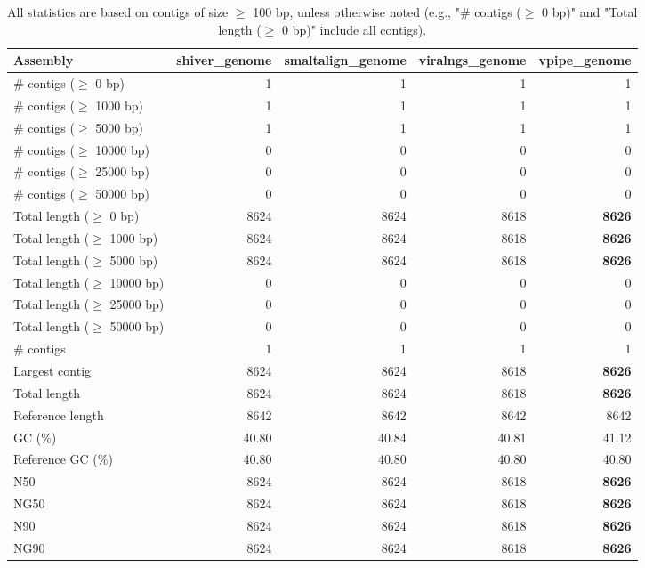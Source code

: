 \documentclass[12pt,a4paper]{article}
\begin{document}
\begin{table}[ht]
\begin{center}
\caption{All statistics are based on contigs of size $\geq$ 100 bp, unless otherwise noted (e.g., "\# contigs ($\geq$ 0 bp)" and "Total length ($\geq$ 0 bp)" include all contigs).}
\begin{tabular}{|l*{4}{|r}|}
\hline
Assembly & shiver\_genome & smaltalign\_genome & viralngs\_genome & vpipe\_genome \\ \hline
\# contigs ($\geq$ 0 bp) & 1 & 1 & 1 & 1 \\ \hline
\# contigs ($\geq$ 1000 bp) & 1 & 1 & 1 & 1 \\ \hline
\# contigs ($\geq$ 5000 bp) & 1 & 1 & 1 & 1 \\ \hline
\# contigs ($\geq$ 10000 bp) & 0 & 0 & 0 & 0 \\ \hline
\# contigs ($\geq$ 25000 bp) & 0 & 0 & 0 & 0 \\ \hline
\# contigs ($\geq$ 50000 bp) & 0 & 0 & 0 & 0 \\ \hline
Total length ($\geq$ 0 bp) & 8624 & 8624 & 8618 & {\bf 8626} \\ \hline
Total length ($\geq$ 1000 bp) & 8624 & 8624 & 8618 & {\bf 8626} \\ \hline
Total length ($\geq$ 5000 bp) & 8624 & 8624 & 8618 & {\bf 8626} \\ \hline
Total length ($\geq$ 10000 bp) & 0 & 0 & 0 & 0 \\ \hline
Total length ($\geq$ 25000 bp) & 0 & 0 & 0 & 0 \\ \hline
Total length ($\geq$ 50000 bp) & 0 & 0 & 0 & 0 \\ \hline
\# contigs & 1 & 1 & 1 & 1 \\ \hline
Largest contig & 8624 & 8624 & 8618 & {\bf 8626} \\ \hline
Total length & 8624 & 8624 & 8618 & {\bf 8626} \\ \hline
Reference length & 8642 & 8642 & 8642 & 8642 \\ \hline
GC (\%) & 40.80 & 40.84 & 40.81 & 41.12 \\ \hline
Reference GC (\%) & 40.80 & 40.80 & 40.80 & 40.80 \\ \hline
N50 & 8624 & 8624 & 8618 & {\bf 8626} \\ \hline
NG50 & 8624 & 8624 & 8618 & {\bf 8626} \\ \hline
N90 & 8624 & 8624 & 8618 & {\bf 8626} \\ \hline
NG90 & 8624 & 8624 & 8618 & {\bf 8626} \\ \hline

\end{tabular}
\end{center}
\end{table}
\end{document}
